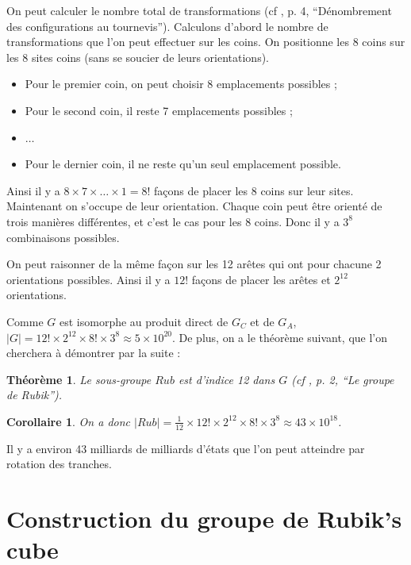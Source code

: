 \documentclass[french]{report}
\newtheorem{theorem}{Théorème}
\newtheorem*{corollary}{Corollaire}
\begin{document}
On peut calculer le nombre total de transformations (cf \cite{culture_ens}, p. 4, ``Dénombrement des configurations au tournevis''). Calculons d'abord le nombre de transformations que l'on peut effectuer sur les coins. On positionne les 8 coins sur les 8 sites coins (sans se soucier de leurs orientations).

\begin{itemize}
  \item Pour le premier coin, on peut choisir 8 emplacements possibles ;
  \item Pour le second coin, il reste 7 emplacements possibles ;
  \item $\dots$
  \item Pour le dernier coin, il ne reste qu'un seul emplacement possible.
\end{itemize}

Ainsi il y a $8 \times 7 \times \dots \times 1 = 8!  $ façons de placer les 8 coins sur leur sites. Maintenant on s'occupe de leur orientation. Chaque coin peut être orienté de trois manières différentes, et c'est le cas pour les 8 coins. Donc il y a $3 ^8$ combinaisons possibles.

On peut raisonner de la même façon sur les 12 arêtes qui ont pour chacune 2 orientations possibles. Ainsi il y a $12!$ façons de placer les arêtes et $2 ^{12}$ orientations.

Comme $G$ est isomorphe au produit direct de $G_C$ et de $G_A$,  $\mid G \mid = 12! \times 2 ^{12} \times 8! \times 3 ^{8} \approx 5 \times 10 ^{20}$. De plus, on a le théorème suivant, que l'on cherchera à démontrer par la suite :

\begin{theorem}
  Le sous-groupe $Rub$ est d'indice 12 dans $G$ (cf \cite{colmez_rubik}, p. 2, ``Le groupe de Rubik'').
\end{theorem}

\begin{corollary}
  On a donc $\mid Rub \mid = \frac{1}{12} \times 12! \times 2 ^{12}\times 8! \times 3 ^{8} \approx 43 \times 10 ^{18}$.
\end{corollary}

Il y a environ 43 milliards de milliards d'états que l'on peut atteindre par rotation des tranches.


\chapter{Construction du groupe de Rubik's cube} \label{construction}
\end{document}
